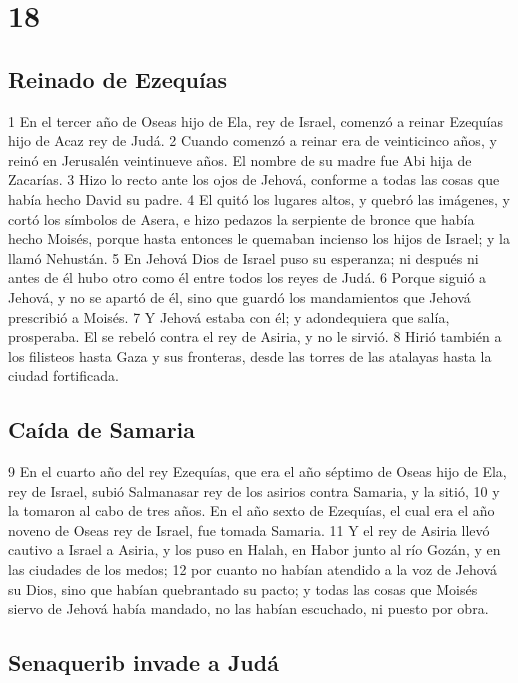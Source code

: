 \chapter{18}

\section*{Reinado de Ezequías}

1 En el tercer año de Oseas hijo de Ela, rey de Israel, comenzó a reinar Ezequías hijo de Acaz rey de Judá.
2 Cuando comenzó a reinar era de veinticinco años, y reinó en Jerusalén veintinueve años. El nombre de su madre fue Abi hija de Zacarías.
3 Hizo lo recto ante los ojos de Jehová, conforme a todas las cosas que había hecho David su padre.
4 El quitó los lugares altos, y quebró las imágenes, y cortó los símbolos de Asera, e hizo pedazos la serpiente de bronce que había hecho Moisés, porque hasta entonces le quemaban incienso los hijos de Israel; y la llamó Nehustán.
5 En Jehová Dios de Israel puso su esperanza; ni después ni antes de él hubo otro como él entre todos los reyes de Judá. 
6 Porque siguió a Jehová, y no se apartó de él, sino que guardó los mandamientos que Jehová prescribió a Moisés.
7 Y Jehová estaba con él; y adondequiera que salía, prosperaba. El se rebeló contra el rey de Asiria, y no le sirvió.
8 Hirió también a los filisteos hasta Gaza y sus fronteras, desde las torres de las atalayas hasta la ciudad fortificada.

\section*{Caída de Samaria}

9 En el cuarto año del rey Ezequías, que era el año séptimo de Oseas hijo de Ela, rey de Israel, subió Salmanasar rey de los asirios contra Samaria, y la sitió,
10 y la tomaron al cabo de tres años. En el año sexto de Ezequías, el cual era el año noveno de Oseas rey de Israel, fue tomada Samaria.
11 Y el rey de Asiria llevó cautivo a Israel a Asiria, y los puso en Halah, en Habor junto al río Gozán, y en las ciudades de los medos;
12 por cuanto no habían atendido a la voz de Jehová su Dios, sino que habían quebrantado su pacto; y todas las cosas que Moisés siervo de Jehová había mandado, no las habían escuchado, ni puesto por obra.

\section*{Senaquerib invade a Judá}

